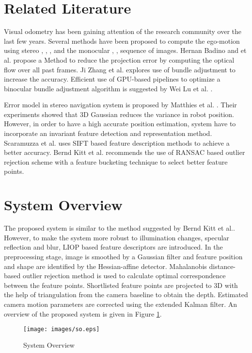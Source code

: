 \documentclass{article}
\begin{document}
\section{Related Literature}

Visual odometry has been gaining attention of the research community over the last few years. Several methods have been proposed to compute the ego-motion using stereo \cite{mandelbaum1999correlation}, \cite{mallet2000position}, \cite{Kitt2010IV}, \cite{badino2013visual} and the monocular \cite{bruss1983passive}, \cite{heeger1992subspace}, \cite{kanatani19933} \cite{wagner1999robust} sequence of images. Hernan Badino and et al. \cite{badino2013visual} propose a Method to reduce the projection error by computing the optical flow  over all past frames. Ji Zhang et al. \cite{zhang2014real} explores use of bundle adjustment to increase the accuracy. Efficient use of GPU-based pipelines to optimize a  binocular bundle adjustment algorithm is suggested by Wei Lu et al. \cite{hpvo}.

\par
Error model in stereo navigation system is proposed by Matthies et al. \cite{matthies1987error}. Their experiments showed that  3D Gaussian reduces the variance in robot position. However, in order to have a high accurate position estimation, system have to incorporate an invariant feature detection and representation method.  Scaramuzza et al. \cite{Scaramuzza2008} uses SIFT based feature description methods to achieve a better accuracy. Bernd Kitt et al. \cite{Kitt2010IV} recommends the use of RANSAC based outlier  rejection  scheme with a feature bucketing technique to select better feature points.


\section{System Overview}

The proposed system is similar to the method suggested by Bernd Kitt et al.\cite{Kitt2010IV}. However, to make the system more robust to illumination changes, specular reflection and blur, LIOP \cite{wang2011local} based feature descriptors are introduced. In the preprocessing stage, image is smoothed by a Gaussian filter and feature position and shape are identified by the Hessian-affine detector\cite{mikolajczyk2002affine}. Mahalanobis distance-based outlier rejection \cite{Blanco2012} method is used to calculate optimal correspondence between the feature points. Shortlisted feature points are projected to 3D with the help of triangulation from the camera baseline to obtain the depth. Estimated camera motion parameters are corrected using   the extended Kalman filter. An overview of the proposed system is given in Figure \ref{sv}.
\begin{figure}[ht]
 \centering
 \texttt{[image: images/so.eps]}
\caption{System Overview}
\label{sv}
\end{figure}
\end{document}
